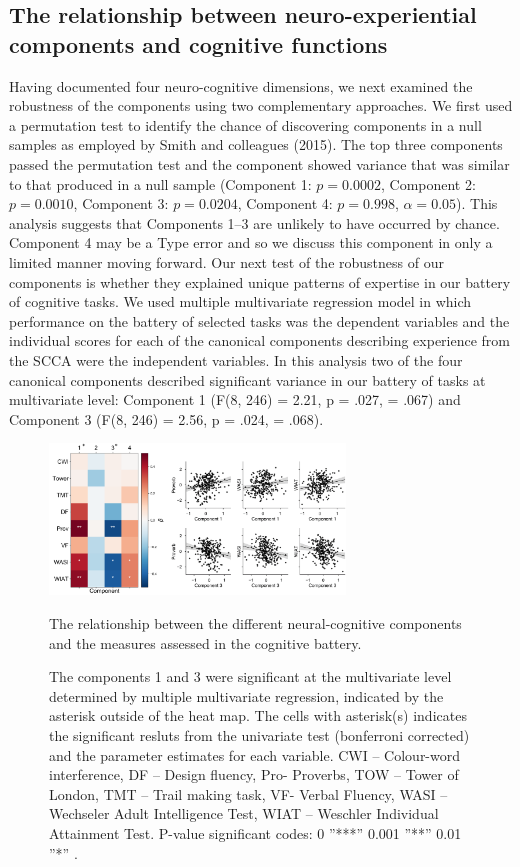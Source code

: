 \subsection{The relationship between neuro-experiential components and cognitive functions}
\label{study2:results:manova}
Having documented four neuro-cognitive dimensions, we next examined the robustness of the components using two complementary approaches. We first used a permutation test to identify the chance of discovering components in a null samples as employed by Smith and colleagues (2015). The top three components passed the permutation test and the  component showed variance that was similar to that produced in a null sample 
(Component 1: \(\mathit{p} = 0.0002\), 
Component 2: \(\mathit{p} = 0.0010\), 
Component 3: \(\mathit{p} = 0.0204\), 
Component 4: \(\mathit{p} = 0.998\), 
\(\alpha = 0.05\)). 
This analysis suggests that Components 1--3 are unlikely to have occurred by chance. Component 4 may be a Type  error and so we discuss this component in only a limited manner moving forward.
Our next test of the robustness of our components is whether they explained unique patterns of expertise in our battery of cognitive tasks. We used multiple multivariate regression model in which performance on the battery of selected tasks was the dependent variables and the individual scores for each of the canonical components describing experience from the SCCA were the independent variables. In this analysis two of the four canonical components described significant variance in our battery of tasks at multivariate level: Component 1 (F(8, 246) = 2.21, p = .027, \paretasquared = .067) and Component 3 (F(8, 246) = 2.56, p = .024, \paretasquared = .068). 
\begin{figure}[H]
    \centering
    \includegraphics[width=0.7\textwidth]{chapters/img/study2fig3.png}
    \caption{The relationship between the different neural-cognitive components and the measures assessed in the cognitive battery.} 
    \caption*{
    \footnotesize{
    The components 1 and 3 were significant at the multivariate level determined by multiple multivariate regression, indicated by the asterisk outside of the heat map. The cells with asterisk(s) indicates the significant resluts from the univariate test (bonferroni corrected) and the parameter estimates for each variable. CWI – Colour-word interference, DF – Design fluency, Pro- Proverbs, TOW – Tower of London, TMT – Trail making task, VF- Verbal Fluency, WASI – Wechseler Adult Intelligence Test, WIAT – Weschler Individual Attainment Test. P-value significant codes:  0 ”***” 0.001 ”**” 0.01 ”*” .}
    }
    \label{fig:study2:fig3}
\end{figure}
